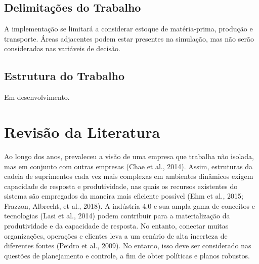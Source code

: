 \documentclass[
]{book}
\begin{document}
\hypertarget{delimitauxe7uxf5es-do-trabalho}{%
\section{Delimitações do Trabalho}\label{delimitauxe7uxf5es-do-trabalho}}

A implementação se limitará a considerar estoque de matéria-prima, produção e transporte. Áreas adjacentes podem estar presentes na simulação, mas não serão consideradas nas variáveis de decisão.

\hypertarget{estrutura-do-trabalho}{%
\section{Estrutura do Trabalho}\label{estrutura-do-trabalho}}

Em desenvolvimento.

\hypertarget{revisuxe3o-da-literatura}{%
\chapter{Revisão da Literatura}\label{revisuxe3o-da-literatura}}

Ao longo dos anos, prevaleceu a visão de uma empresa que trabalha não isolada, mas em conjunto com outras empresas (Chae et al., 2014). Assim, estruturas da cadeia de suprimentos cada vez mais complexas em ambientes dinâmicos exigem capacidade de resposta e produtividade, nas quais os recursos existentes do sistema são empregados da maneira mais eficiente possível (Ehm et al., 2015; Frazzon, Albrecht, et al., 2018). A indústria 4.0 e sua ampla gama de conceitos e tecnologias (Lasi et al., 2014) podem contribuir para a materialização da produtividade e da capacidade de resposta. No entanto, conectar muitas organizações, operações e clientes leva a um cenário de alta incerteza de diferentes fontes (Peidro et al., 2009). No entanto, isso deve ser considerado nas questões de planejamento e controle, a fim de obter políticas e planos robustos.
\end{document}
